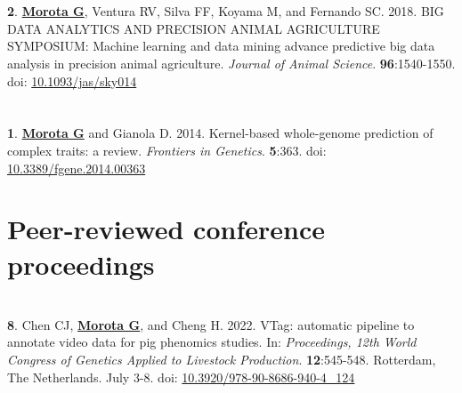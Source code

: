 \documentclass[margin,line,10pt]{res}
\newenvironment{list1}{
  \begin{list}{\ding{113}}{%
      \setlength{\itemsep}{0in}
      \setlength{\parsep}{0in} \setlength{\parskip}{0in}
      \setlength{\topsep}{0in} \setlength{\partopsep}{0in} 
      \setlength{\leftmargin}{0.17in}}}{\end{list}}
\begin{document}
\begin{resume}
\begin{list1}
\end{list1}


\section{}
\begin{list1}

 \item  [{\bf 2}.] \textbf{\underline{Morota G}}, Ventura RV, Silva FF, Koyama M, and Fernando SC. 2018. BIG DATA ANALYTICS AND PRECISION ANIMAL AGRICULTURE SYMPOSIUM: Machine learning and data mining advance predictive big data analysis in precision animal agriculture. \emph{Journal of Animal Science}. \textbf{96}:1540-1550. doi: \textcolor{blue}{\href{http://dx.doi.org/10.1093/jas/sky014}{10.1093/jas/sky014}}
   
\end{list1}


\section{}
\begin{list1}

 \item [{\bf 1}.]  {\bf \underline{Morota G}} and Gianola D. 2014. 
  Kernel-based whole-genome prediction of complex traits: a review. \emph{Frontiers in Genetics}. {\bf 5}:363. doi: \textcolor{blue}{\href{http://dx.doi.org/10.3389/fgene.2014.00363}{10.3389/fgene.2014.00363}} 

\end{list1}




\vspace{1.0cm}
\section{\sc Peer-reviewed conference proceedings}
\vspace{1.5cm}

\section{}
\begin{list1}

\item [{\bf 8}.] Chen CJ, \textbf{\underline{Morota G}}, and Cheng H. 2022. VTag: automatic pipeline to annotate video data for pig phenomics studies. In: \emph{Proceedings, 12th World Congress of Genetics Applied to Livestock Production}. \textbf{12}:545-548. Rotterdam, The Netherlands. July 3-8. doi: \textcolor{blue}{\href{https://doi.org/10.3920/978-90-8686-940-4_124
}{10.3920/978-90-8686-940-4\_124}}  


\end{list1}
\end{resume}
\end{document}
